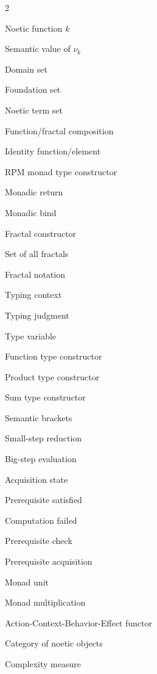 \documentclass[11pt,twoside,openright]{book}
\theoremstyle{definition}
\theoremstyle{plain}
\theoremstyle{remark}
\newcommand{\noe}[1]{\nu_{#1}}
\newcommand{\RPM}{\mathfrak{R}}
\newcommand{\rpmret}{\mathsf{return}}
\newcommand{\rpmbind}{\mathbin{\gg\!=}}
\newcommand{\Frac}{\Phi}
\newcommand{\FracSet}{\mathbf{Frac}}
\newcommand{\Dom}{\mathsf{Dom}}
\newcommand{\Fund}{\mathsf{Fund}}
\newcommand{\NoeTerm}{\mathsf{NoeTerm}}
\newcommand{\id}{\mathrm{id}}
\newcommand{\smallstep}{\to}
\newcommand{\bigstep}{\Downarrow}
\newcommand{\Satisfied}{\mathsf{Sat}}
\newcommand{\Failed}{\mathsf{Fail}}
\begin{document}
\begin{multicols}{2}
\begin{description}[leftmargin=2em,labelindent=0em]
\item[$\noe{k}$] Noetic function $k$
\item[$\mathfrak{n}_k$] Semantic value of $\noe{k}$
\item[$\Dom$] Domain set
\item[$\Fund$] Foundation set
\item[$\NoeTerm$] Noetic term set
\item[$\circ$] Function/fractal composition
\item[$\id$] Identity function/element
\item[$\RPM$] RPM monad type constructor
\item[$\rpmret$] Monadic return
\item[$\rpmbind$] Monadic bind
\item[$\Frac$] Fractal constructor
\item[$\FracSet$] Set of all fractals
\item[$\langle k_1 : \cdots : k_n \rangle$] Fractal notation
\item[$\Gamma$] Typing context
\item[$\vdash$] Typing judgment
\item[$\tau$] Type variable
\item[$\to$] Function type constructor
\item[$\times$] Product type constructor
\item[$+$] Sum type constructor
\item[$\llbracket \cdot \rrbracket$] Semantic brackets
\item[$\smallstep$] Small-step reduction
\item[$\bigstep$] Big-step evaluation
\item[$\alpha$] Acquisition state
\item[$\Satisfied$] Prerequisite satisfied
\item[$\Failed$] Computation failed
\item[$\mathsf{check}$] Prerequisite check
\item[$\mathsf{acquire}$] Prerequisite acquisition
\item[$\eta$] Monad unit
\item[$\mu$] Monad multiplication
\item[$\text{ACBE}$] Action-Context-Behavior-Effect functor
\item[$\mathbf{Noetica}$] Category of noetic objects
\item[$\mathcal{M}$] Complexity measure
\end{description}
\end{multicols}
\end{document}
